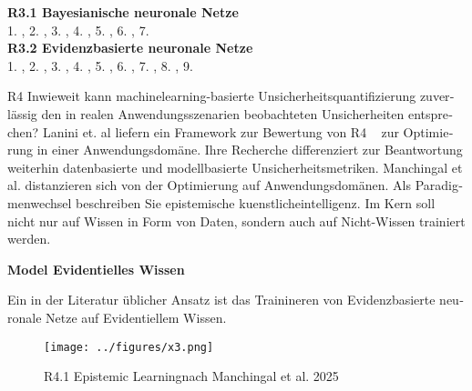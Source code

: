 \begin{otherlanguage}{ngerman}
{\begin{minipage}[t]{\textwidth}
\textbf{R3.1 Bayesianische neuronale Netze}\\
1. \parencite[Kap.~2.3]{gal2016uncertainty},
2. \parencite[Kap.~3]{blundell2015weight},
3. \parencite[S.~40–41]{gal2016uncertainty},
4. \parencite[S.~41–42]{gal2016uncertainty},
5. \parencite[Kap.~7.4]{rasmussen2006gaussian},
6. \parencite[S.~16]{bishop2006pattern},
7. \parencite[S.~29–31]{gal2016uncertainty} \\[0.125em]

\textbf{R3.2 Evidenzbasierte neuronale Netze}\\
1. \parencite{sensoy2018evidential},
2. \parencite[S.~3–4]{sensoy2018evidential},
3. \parencite[S.~4]{sensoy2018evidential},
4. \parencite[S.~5]{sensoy2018evidential},
5. \parencite[S.~6]{sensoy2018evidential},
6. \parencite[S.~6–7]{sensoy2018evidential},
7. \parencite{kendall2017uncertainties},
8. \parencite{kendall2017uncertainties},
9. \parencite[S.~6]{sensoy2018evidential}
\end{minipage}%
}

\pagebreak


R4 Inwieweit kann \gls{machinelearning}-basierte Unsicherheitsquantifizierung zuverlässig den in realen Anwendungsszenarien beobachteten Unsicherheiten entsprechen?
\newline
Lanini et. al liefern ein Framework zur Bewertung von R4 ~\parencite{Lanini2024} zur Optimierung in einer Anwendungsdomäne. Ihre Recherche differenziert zur Beantwortung weiterhin datenbasierte und modellbasierte Unsicherheitsmetriken. 
\newline
Manchingal et al. distanzieren sich von der Optimierung auf Anwendungsdomänen. Als Paradigmenwechsel beschreiben Sie epistemische \gls{kuenstlicheintelligenz}. Im Kern soll nicht nur auf Wissen in Form von Daten, sondern auch auf Nicht-Wissen trainiert werden. \parencite{manchingal2025}


\pagebreak


\textbf{Model Evidentielles Wissen}

Ein in der Literatur üblicher Ansatz ist das Trainineren von \gls{Evidenzbasierte neuronale Netze} auf Evidentiellem Wissen. 

\begin{figure}[!ht]
  \centering
  \texttt{[image: ../figures/x3.png]}
  \caption{R4.1 \glqq Epistemic Learning\grqq nach Manchingal et al. 2025}
\end{figure}


\end{otherlanguage}
